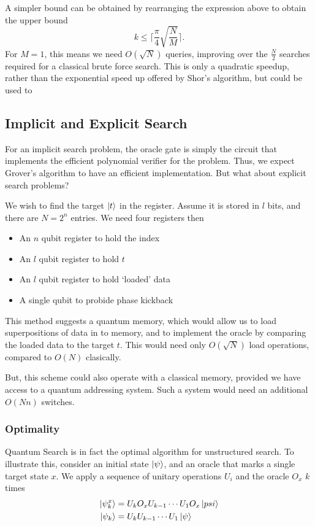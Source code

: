 \documentclass[11pt]{article}
\begin{document}
A simpler bound can be obtained by rearranging the expression above to obtain the upper bound
\begin{equation}
    k \leq \lceil \frac{\pi}{4}\sqrt{\frac{N}{M}} \rceil.
\end{equation}
For $M=1$, this means we need $O(\sqrt{N})$ queries, improving over the $\frac{N}{2}$ searches required for a classical brute force search. This is only a quadratic speedup, rather than the exponential speed up offered by Shor's algorithm, but could be used to

\subsection*{Implicit and Explicit Search}
For an implicit search problem, the oracle gate is simply the circuit that implements the efficient polynomial verifier for the problem. Thus, we expect Grover's algorithm to have an efficient implementation. But what about explicit search problems?

We wish to find the target $\ket{t}$ in the register. Assume it is stored in $l$ bits, and there are $N=2^{n}$ entries. We need four registers then
\begin{itemize}
    \item An $n$ qubit register to hold the index
    \item An $l$ qubit register to hold $t$
    \item An $l$ qubit register to hold `loaded' data
    \item A single qubit to probide phase kickback
\end{itemize}

This method suggests a quantum memory, which would allow us to load superpositions of data in to memory, and to implement the oracle by comparing the loaded data to the target $t$. This would need only $O(\sqrt{N})$ load operations, compared to $O(N)$ clasically.

But, this scheme could also operate with a classical memory, provided we have access to a quantum addressing system. Such a system would need an additional $O(Nn)$ switches.

\subsubsection*{Optimality}
Quantum Search is in fact the optimal algorithm for unstructured search. To illustrate this, consider an initial state $\ket{\psi}$, and an oracle that marks a single target state $x$. We apply a sequence of unitary operations $U_{i}$ and the oracle $O_{x}$ $k$ times
\begin{align*}
  \ket{\psi_{k}^{x}}&=U_{k}O_{x}U_{k-1}\cdots U_{1}O_{x}\ket{psi}\\
  \ket{\psi_{k}} &= U_{k}U_{k-1}\cdots U_{1}\ket{\psi}
\end{align*}
\end{document}
